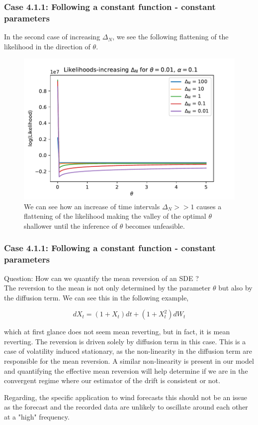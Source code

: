 \documentclass[aspectratio=169]{beamer}\usepackage[utf8]{inputenc}
\begin{document}
\begin{frame}\frametitle{ Case 4.1.1: Following a constant function - constant parameters }
In the second case of increasing $\Delta_N$, we see the following flattening of the likelihood in the direction of $\theta$.
\begin{figure}
    \includegraphics[scale=0.5]{Figures/dt_increasing_moments.pdf}
      
  \caption{We can see how an increase of time intervals $\Delta_N >>1$  causes a flattening of the likelihood making the valley of the optimal $\theta$ shallower  until the  inference of  $\theta$ becomes unfeasible.  }
\end{figure}
\end{frame}


\begin{frame}\frametitle{ Case 4.1.1: Following a constant function - constant parameters }

Question: How can we quantify the mean reversion of an SDE   ?  \\

The reversion to the mean is not only determined by the parameter $\theta$ but also by the diffusion term. We can see this in the following example,

\begin{equation}
dX_t = (1+X_t)dt + (1+X_t^2) dW_t
\end{equation}

which at first glance does not seem mean reverting, but in fact,  it is mean reverting. The reversion is driven  solely  by diffusion term in this case.  This is a case of volatility induced stationary, as the non-linearity in the diffusion term are responsible for the mean reversion. A similar non-linearity is present in our model and quantifying the effective mean reversion  will help determine if we are in the convergent regime  where our estimator of the drift is consistent or not.

Regarding, the specific application to wind forecasts this should not be an issue as the forecast and the recorded data are unlikely to oscillate around each other at a "high" frequency.


\end{frame}
\end{document}
